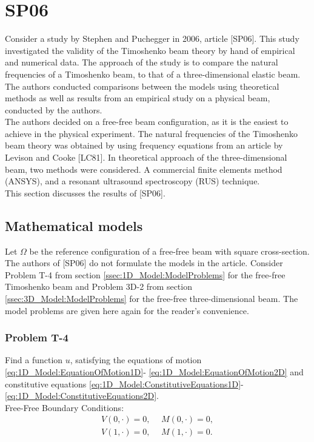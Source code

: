 \documentclass[../../main.tex]{subfiles}
\begin{document}
\section{SP06} \label{sec:SP06}
Consider a study by Stephen and Puchegger in 2006, article [SP06]. This study investigated the validity of the Timoshenko beam theory by hand of empirical and numerical data. The approach of the study is to compare the natural frequencies of a Timoshenko beam, to that of a three-dimensional elastic beam. The authors conducted comparisons between the models using theoretical methods as well as results from an empirical study on a physical beam, conducted by the authors.\\

The authors decided on a free-free beam configuration, as it is the easiest to achieve in the physical experiment. The natural frequencies of the Timoshenko beam theory was obtained by using frequency equations from an article by Levison and Cooke [LC81]. In theoretical approach of the three-dimensional beam, two methods were considered. A commercial finite elements method (ANSYS), and a resonant ultrasound spectroscopy (RUS) technique.\\

This section discusses the results of [SP06].

\subsection{Mathematical models}
Let $\Omega$ be the reference configuration of a free-free beam with square cross-section. The authors of [SP06] do not formulate the models in the article. Consider Problem T-4 from section \ref{ssec:1D_Model:ModelProblems} for the free-free Timoshenko beam and Problem 3D-2 from section \ref{ssec:3D_Model:ModelProblems} for the free-free three-dimensional beam. The model problems are given here again for the reader's convenience.

\subsubsection*{Problem T-4}
Find a function $u$, satisfying the equations of motion \eqref{eq:1D_Model:EquationOfMotion1D}- \eqref{eq:1D_Model:EquationOfMotion2D} and constitutive equations \eqref{eq:1D_Model:ConstitutiveEquations1D}- \eqref{eq:1D_Model:ConstitutiveEquations2D}.\\

{Free-Free Boundary Conditions:}
\begin{eqnarray}
	V(0,\cdot) = 0, \ \ &M(0,\cdot) = 0, \label{BC_1}\\
	V(1,\cdot) = 0, \ \ &M(1,\cdot) = 0. \label{BC_2}
\end{eqnarray}
\end{document}
